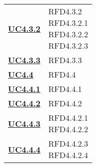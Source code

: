 \begin{longtable}[H]{| >{\centering\bfseries}p{8cm} | >{\centering\arraybackslash}p{8cm} |}
    \hyperref[par:uc4.3.2]{UC4.3.2}  & \makecell{
        \rule{0pt}{4ex}
    RFD4.3.2                                                                                                     \\
    RFD4.3.2.1                                                                                                   \\
    RFD4.3.2.2                                                                                                   \\
    RFD4.3.2.3                                                                                                   \\
        \rule{0pt}{4ex}
    }                                                                                                            \\

    \hyperref[par:uc4.3.3]{UC4.3.3}  & RFD4.3.3                                                                  \\


    \hyperref[ssub:uc4.4]{UC4.4}     & RFD4.4                                                                    \\

    \hyperref[par:uc4.4.1]{UC4.4.1}  & RFD4.4.1                                                                  \\

    \hyperref[par:uc4.4.2]{UC4.4.2}  & RFD4.4.2                                                                  \\

    \hyperref[par:uc4.4.3]{UC4.4.3}  & \makecell{
        \rule{0pt}{4ex}
    RFD4.4.2.1                                                                                                   \\
    RFD4.4.2.2                                                                                                   \\
        \rule{0pt}{4ex}
    }                                                                                                            \\

    \hyperref[par:uc4.4.4]{UC4.4.4}  & \makecell{
        \rule{0pt}{4ex}
    RFD4.4.2.3                                                                                                   \\
    RFD4.4.2.4                                                                                                   \\
        \rule{0pt}{4ex}
    }                                                                                                            \\


\end{longtable}
